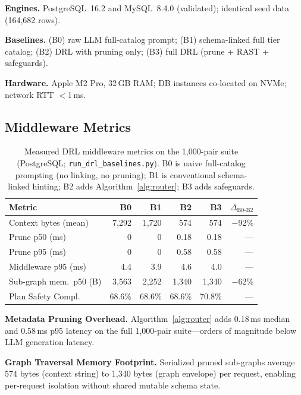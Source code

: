 \documentclass[twocolumn]{svjour3}
\begin{document}
\textbf{Engines.} PostgreSQL~16.2 and MySQL~8.4.0 (validated); identical seed data (164{,}682 rows).

\textbf{Baselines.} (B0) raw LLM full-catalog prompt; (B1) schema-linked full tier catalog; (B2) DRL with pruning only; (B3) full DRL (prune + RAST + safeguards).

\textbf{Hardware.} Apple M2 Pro, 32\,GB RAM; DB instances co-located on NVMe; network RTT $<$1\,ms.

\subsection{Middleware Metrics}

\begin{table}[t]
\centering
\caption{Measured DRL middleware metrics on the 1{,}000-pair suite (PostgreSQL; \texttt{run\_drl\_baselines.py}). B0 is naive full-catalog prompting (no linking, no pruning); B1 is conventional schema-linked hinting; B2 adds Algorithm~\ref{alg:router}; B3 adds safeguards.}
\label{tab:middleware}
\footnotesize
\setlength{\tabcolsep}{3pt}
\begin{tabular}{@{}lrrrrr@{}}
\toprule
\textbf{Metric} & \textbf{B0} & \textbf{B1} & \textbf{B2} & \textbf{B3} & \textbf{$\Delta_{\text{B0-B2}}$} \\
\midrule
Context bytes (mean) & 7{,}292 & 1{,}720 & 574 & 574 & $-$92\% \\
Prune p50 (ms) & 0 & 0 & 0.18 & 0.18 & --- \\
Prune p95 (ms) & 0 & 0 & 0.58 & 0.58 & --- \\
Middleware p95 (ms) & 4.4 & 3.9 & 4.6 & 4.0 & --- \\
Sub-graph mem.\ p50 (B) & 3{,}563 & 2{,}252 & 1{,}340 & 1{,}340 & $-$62\% \\
Plan Safety Compl.\ & 68.6\% & 68.6\% & 68.6\% & 70.8\% & --- \\
\bottomrule
\end{tabular}
\end{table}

\textbf{Metadata Pruning Overhead.} Algorithm~\ref{alg:router} adds 0.18\,ms median and 0.58\,ms p95 latency on the full 1{,}000-pair suite---orders of magnitude below LLM generation latency.

\textbf{Graph Traversal Memory Footprint.} Serialized pruned sub-graphs average 574 bytes (context string) to 1{,}340 bytes (graph envelope) per request, enabling per-request isolation without shared mutable schema state.
\end{document}
